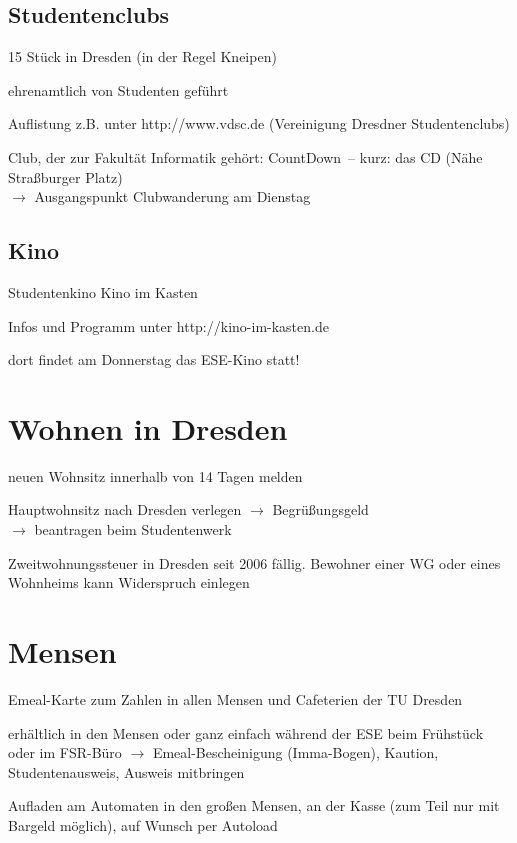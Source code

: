 \documentclass[a4paper,12pt]{report}
\begin{document}
\subsection{Studentenclubs}
\begin{itemize*}
    \item 15 Stück in Dresden (in der Regel Kneipen)
    \item ehrenamtlich von Studenten geführt
    \item  Auflistung z.B. unter http://www.vdsc.de (Vereinigung Dresdner Studentenclubs)
    \item Club, der zur Fakultät Informatik gehört: \glqq CountDown\grqq\ -- kurz: das CD (Nähe Straßburger Platz)\\
    $\rightarrow$ Ausgangspunkt Clubwanderung am Dienstag
\end{itemize*}

\subsection{Kino}
\begin{itemize*}
    \item Studentenkino \glqq Kino im Kasten\grqq
    \item Infos und Programm unter http://kino-im-kasten.de
    \item dort findet am Donnerstag das ESE-Kino statt!
\end{itemize*}


\section{Wohnen in Dresden}
\begin{itemize*}

    \item neuen Wohnsitz innerhalb von 14 Tagen melden
    \item Hauptwohnsitz nach Dresden verlegen $\rightarrow$  \glqq Begrüßungsgeld\grqq\\
  $\rightarrow$ beantragen beim Studentenwerk
  \item Zweitwohnungssteuer in Dresden seit 2006 fällig. Bewohner einer WG oder eines Wohnheims kann Widerspruch einlegen
\end{itemize*}

\section{Mensen}
\begin{itemize*}
    \item Emeal-Karte zum Zahlen in allen Mensen und Cafeterien der TU Dresden
    \item erhältlich in den Mensen oder ganz einfach während der ESE beim Frühstück oder im FSR-Büro
    $\rightarrow$ Emeal-Bescheinigung (Imma-Bogen),  Kaution, Studentenausweis, Ausweis mitbringen
    \item Aufladen am Automaten in den großen Mensen, an der Kasse (zum Teil nur mit Bargeld möglich), auf Wunsch per Autoload
\end{itemize*}
\end{document}
